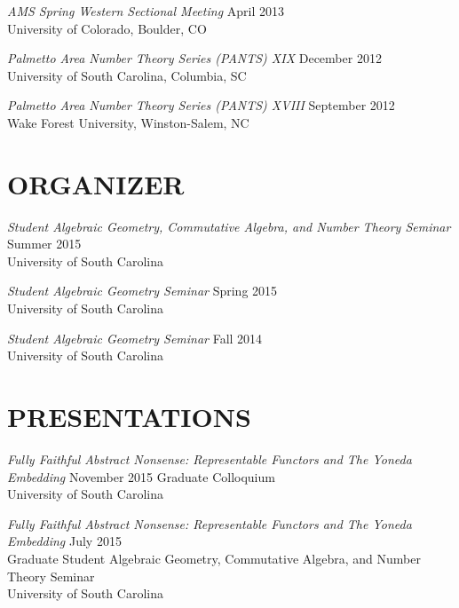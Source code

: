 \documentclass[line,overlapped]{res}
\begin{document}
\begin{resume}
                                  {\sl AMS Spring Western Sectional Meeting} \hfill April 2013\\
                                  University of Colorado, Boulder, CO

                                  {\sl Palmetto Area Number Theory Series (PANTS) XIX} \hfill December 2012\\
                                  University of South Carolina, Columbia, SC

                                  {\sl Palmetto Area Number Theory Series (PANTS) XVIII} \hfill September 2012\\
                                  Wake Forest University, Winston-Salem, NC

	                          \section{ORGANIZER}
		                          {\sl Student Algebraic Geometry, Commutative Algebra, and Number Theory Seminar} \hfill Summer 2015\\
		                          University of South Carolina
	                                  
                                          {\sl Student Algebraic Geometry Seminar} \hfill Spring 2015\\
		                          University of South Carolina

                                          {\sl Student Algebraic Geometry Seminar} \hfill Fall 2014\\
		                          University of South Carolina
                                          \section{PRESENTATIONS}
                                                  {\sl Fully Faithful Abstract Nonsense: Representable Functors and The Yoneda Embedding} \hfill November 2015
                                                  Graduate Colloquium\\
                                                  University of South Carolina

                                                  {\sl Fully Faithful Abstract Nonsense: Representable Functors and The Yoneda Embedding} \hfill July 2015\\
                                                  Graduate Student Algebraic Geometry, Commutative Algebra, and Number Theory Seminar\\
                                                  University of South Carolina
                                                  \newpage

\end{resume}
\end{document}
